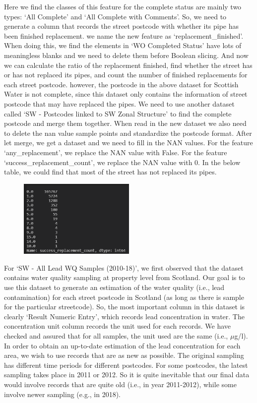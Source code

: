 \documentclass[11pt,twoside]{article}
\numberwithin{Theorem}{section}
\numberwithin{Definition}{section}
\numberwithin{Lemma}{section}
\numberwithin{Algorithm}{section}
\numberwithin{equation}{section}
\begin{document}
Here we find the classes of this feature for the complete status are mainly two types: ‘All Complete’ and ‘All Complete with Comments’. So, we need to generate a column that records the street postcode with whether its pipe has been finished replacement. we name the new feature as ‘replacement\_finished’. When doing this, we find the elements in ‘WO Completed Status’ have lots of meaningless blanks and we need to delete them before Boolean slicing. And now we can calculate the ratio of the replacement finished, find whether the street has or has not replaced its pipes, and count the number of finished replacements for each street postcode. however, the postcode in the above dataset for Scottish Water is not complete, since this dataset only contains the information of street postcode that may have replaced the pipes. We need to use another dataset called ‘SW - Postcodes linked to SW Zonal Structure’ to find the complete postcode and merge them together. When read in the new dataset we also need to delete the nan value sample points and standardize the postcode format. After let merge, we get a dataset and we need to fill in the NAN values. For the feature ‘any\_replacement’, we replace the NAN value with False. For the feature ‘success\_replacement\_count’, we replace the NAN value with 0. In the below table, we could find that most of the street has not replaced its pipes.

\begin{figure}[!ht]
    \centering
    \includegraphics[width=0.5\textwidth]{p11.png}
    \end{figure}

For `SW - All Lead WQ Samples (2010-18)', we first observed that the dataset contains water quality sampling at property level from Scotland. Our goal is to use this dataset to generate an estimation of the water quality (i.e., lead contamination) for each street postcode in Scotland (as long as there is sample for the particular streetcode). So, the most important column in this dataset is clearly `Result Numeric Entry', which records lead concentration in water. The concentration unit column records the unit used for each records. We have checked and assured that for all samples, the unit used are the same (i.e., $\mu$g/l).
In order to obtain an up-to-date estimation of the lead concentration for each area, we wish to use records that are as new as possible. The original sampling has different time periods for different postcodes. For some postcodes, the latest sampling takes place in 2011 or 2012. So it is quite inevitable that our final data would involve records that are quite old (i.e., in year 2011-2012), while some involve newer sampling (e.g., in 2018).
\end{document}
